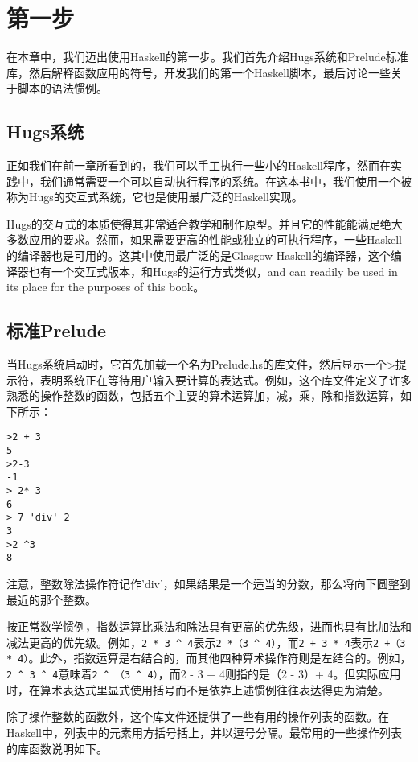 
\chapter{第一步}

在本章中，我们迈出使用Haskell的第一步。我们首先介绍Hugs系统和Prelude标准库，然后解释函数应用的符号，开发我们的第一个Haskell脚本，最后讨论一些关于脚本的语法惯例。

\section{Hugs系统}
正如我们在前一章所看到的，我们可以手工执行一些小的Haskell程序，然而在实践中，我们通常需要一个可以自动执行程序的系统。在这本书中，我们使用一个被称为Hugs的交互式系统，它也是使用最广泛的Haskell实现。

Hugs的交互式的本质使得其非常适合教学和制作原型。并且它的性能能满足绝大多数应用的要求。然而，如果需要更高的性能或独立的可执行程序，一些Haskell的编译器也是可用的。这其中使用最广泛的是Glasgow Haskell的编译器，这个编译器也有一个交互式版本，和Hugs的运行方式类似，and can readily be used in its place for the purposes of this book。

\section{标准Prelude}

当Hugs系统启动时，它首先加载一个名为Prelude.hs的库文件，然后显示一个>提示符，表明系统正在等待用户输入要计算的表达式。例如，这个库文件定义了许多熟悉的操作整数的函数，包括五个主要的算术运算加，减，乘，除和指数运算，如下所示：
\begin{verbatim}
>2 + 3 
5
>2-3
-1
> 2* 3
6
> 7 'div' 2
3
>2 ^3
8
\end{verbatim}

注意，整数除法操作符记作'div'，如果结果是一个适当的分数，那么将向下圆整到最近的那个整数。

按正常数学惯例，指数运算比乘法和除法具有更高的优先级，进而也具有比加法和减法更高的优先级。例如，\verb|2 * 3 ^ 4|表示\verb|2 *（3 ^ 4）|，而\verb|2 + 3 * 4|表示\verb|2 +（3 * 4）|。此外，指数运算是右结合的，而其他四种算术操作符则是左结合的。例如，\verb|2 ^ 3 ^ 4|意味着\verb|2 ^ （3 ^ 4）|，而2 - 3 + 4则指的是（2 - 3）+ 4。但实际应用时，在算术表达式里显式使用括号而不是依靠上述惯例往往表达得更为清楚。 

除了操作整数的函数外，这个库文件还提供了一些有用的操作列表的函数。在Haskell中，列表中的元素用方括号括上，并以逗号分隔。最常用的一些操作列表的库函数说明如下。

